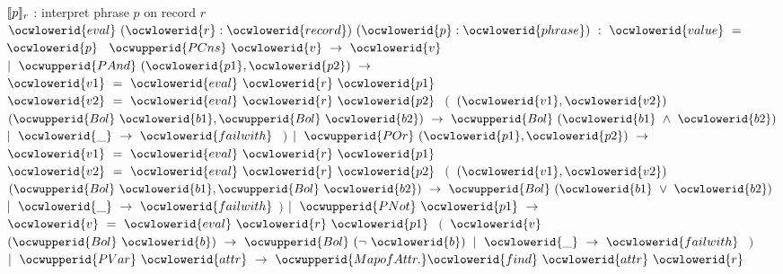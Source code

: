 \documentclass[12pt]{article}
\begin{document}
\ocwendcode{}\ocwindent{0.00em}
$\llbracket p\rrbracket_r$ : interpret phrase $p$ on record $r$ 
\ocweol
\label{rellens.ml:4431}%
\medskip
\ocwbegincode{}\ocwindent{0.00em}
~~$\ocwlowerid{eval}~(\ocwlowerid{r}:\ocwlowerid{record})~(\ocwlowerid{p}:\ocwlowerid{phrase})~:~\ocwlowerid{value}~=~$~$\ocwlowerid{p}~$\ocweol
\ocwindent{1.00em}
$\ocwupperid{PCns}~\ocwlowerid{v}~\rightarrow{}~\ocwlowerid{v}$\ocweol
\ocwindent{0.00em}
$\mid{}~\ocwupperid{PAnd}~(\ocwlowerid{p1},\ocwlowerid{p2})~\rightarrow{}$\ocweol
\ocwindent{2.00em}
~$\ocwlowerid{v1}~=~\ocwlowerid{eval}~\ocwlowerid{r}~\ocwlowerid{p1}~$\ocweol
\ocwindent{2.00em}
~$\ocwlowerid{v2}~=~\ocwlowerid{eval}~\ocwlowerid{r}~\ocwlowerid{p2}~$\ocweol
\ocwindent{2.00em}
$($~$(\ocwlowerid{v1},\ocwlowerid{v2})~$\ocweol
\ocwindent{3.00em}
$(\ocwupperid{Bol}~\ocwlowerid{b1},\ocwupperid{Bol}~\ocwlowerid{b2})~\rightarrow{}~\ocwupperid{Bol}~(\ocwlowerid{b1}~\land{}~\ocwlowerid{b2})$\ocweol
\ocwindent{2.00em}
$\mid{}~\ocwlowerid{\_}~\rightarrow{}~\ocwlowerid{failwith}~$\ocweol
\ocwindent{2.00em}
$)$\ocweol
\ocwindent{0.00em}
$\mid{}~\ocwupperid{POr}~(\ocwlowerid{p1},\ocwlowerid{p2})~\rightarrow{}$\ocweol
\ocwindent{2.00em}
~$\ocwlowerid{v1}~=~\ocwlowerid{eval}~\ocwlowerid{r}~\ocwlowerid{p1}~$\ocweol
\ocwindent{2.00em}
~$\ocwlowerid{v2}~=~\ocwlowerid{eval}~\ocwlowerid{r}~\ocwlowerid{p2}~$\ocweol
\ocwindent{2.00em}
$($~$(\ocwlowerid{v1},\ocwlowerid{v2})~$~\ocweol
\ocwindent{3.00em}
$(\ocwupperid{Bol}~\ocwlowerid{b1},\ocwupperid{Bol}~\ocwlowerid{b2})~\rightarrow{}~\ocwupperid{Bol}~(\ocwlowerid{b1}~\lor{}~\ocwlowerid{b2})~$\ocweol
\ocwindent{2.00em}
$\mid{}~\ocwlowerid{\_}~\rightarrow{}~\ocwlowerid{failwith}~$$)$\ocweol
\ocwindent{0.50em}
$\mid{}~\ocwupperid{PNot}~\ocwlowerid{p1}~\rightarrow{}$\ocweol
\ocwindent{2.00em}
~$\ocwlowerid{v}~=~\ocwlowerid{eval}~\ocwlowerid{r}~\ocwlowerid{p1}~$\ocweol
\ocwindent{2.00em}
$($~$\ocwlowerid{v}~$~\ocweol
\ocwindent{3.00em}
$(\ocwupperid{Bol}~\ocwlowerid{b})~\rightarrow{}~\ocwupperid{Bol}~(\lnot{}~\ocwlowerid{b})$\ocweol
\ocwindent{2.00em}
$\mid{}~\ocwlowerid{\_}~\rightarrow{}~\ocwlowerid{failwith}~$\ocweol
\ocwindent{2.00em}
$)$\ocweol
\ocwindent{0.50em}
$\mid{}~\ocwupperid{PVar}~\ocwlowerid{attr}~\rightarrow{}~\ocwupperid{MapofAttr.}\ocwlowerid{find}~\ocwlowerid{attr}~\ocwlowerid{r}$\ocweol
\end{document}
